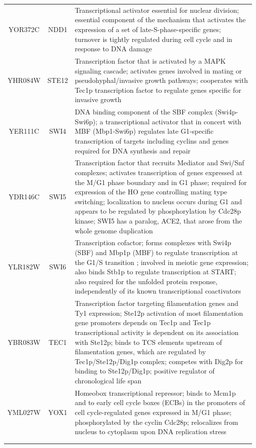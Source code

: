 \documentclass[]{article}
\begin{document}
\begin{longtable}{@{\extracolsep{3pt}} ccp{85mm}}
		YOR372C & NDD1 & Transcriptional activator essential for nuclear division; essential component of the mechanism that activates the expression of a set of late-S-phase-specific genes; turnover is tightly regulated during cell cycle and in response to DNA damage \\ 
		YHR084W & STE12 & Transcription factor that is activated by a MAPK signaling cascade; activates genes involved in mating or pseudohyphal/invasive growth pathways; cooperates with Tec1p transcription factor to regulate genes specific for invasive growth \\ 
		YER111C & SWI4 & DNA binding component of the SBF complex (Swi4p-Swi6p); a transcriptional activator that in concert with MBF (Mbp1-Swi6p) regulates late G1-specific transcription of targets including cyclins and genes required for DNA synthesis and repair \\ 
		YDR146C & SWI5 & Transcription factor that recruits Mediator and Swi/Snf complexes; activates transcription of genes expressed at the M/G1 phase boundary and in G1 phase; required for expression of the HO gene controlling mating type switching; localization to nucleus occurs during G1 and appears to be regulated by phosphorylation by Cdc28p kinase; SWI5 has a paralog, ACE2, that arose from the whole genome duplication \\ 
		YLR182W & SWI6 & Transcription cofactor; forms complexes with Swi4p (SBF) and Mbp1p (MBF) to regulate transcription at the G1/S transition \citep{simon2001serial}; involved in meiotic gene expression; also binds Stb1p to regulate transcription at START; also required for the unfolded protein response, independently of its known transcriptional coactivators \\ 
		YBR083W & TEC1 & Transcription factor targeting filamentation genes and Ty1 expression; Ste12p activation of most filamentation gene promoters depends on Tec1p and Tec1p transcriptional activity is dependent on its association with Ste12p; binds to TCS elements upstream of filamentation genes, which are regulated by Tec1p/Ste12p/Dig1p complex; competes with Dig2p for binding to Ste12p/Dig1p; positive regulator of chronological life span \\ 
		YML027W & YOX1 & Homeobox transcriptional repressor; binds to Mcm1p and to early cell cycle boxes (ECBs) in the promoters of cell cycle-regulated genes expressed in M/G1 phase; phosphorylated by the cyclin Cdc28p; relocalizes from nucleus to cytoplasm upon DNA replication stress \\ 
		\hline \\[-1.8ex] 
		\label{tab:fusedTFs}
	\end{longtable} 
\end{document}
